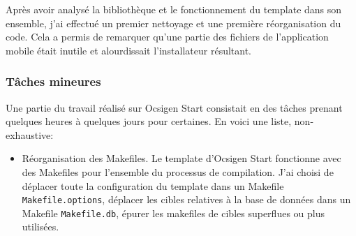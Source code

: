 Après avoir analysé la bibliothèque et le fonctionnement du template dans son
ensemble, j'ai effectué un premier nettoyage et une première réorganisation du
code. Cela a permis de remarquer qu'une partie des fichiers de l'application
mobile était inutile et alourdissait l'installateur résultant.

\subsubsection*{Tâches mineures}

Une partie du travail réalisé sur Ocsigen Start consistait en des tâches prenant
quelques heures à quelques jours pour certaines. En voici une liste,
non-exhaustive:

\begin{itemize}
\item Réorganisation des Makefiles. Le template d'Ocsigen Start fonctionne avec
  des Makefiles pour l'ensemble du processus de compilation. J'ai choisi de
  déplacer toute la configuration du template dans un Makefile
  \verb|Makefile.options|, déplacer les cibles relatives à la base de données
  dans un Makefile \verb|Makefile.db|, épurer les makefiles de cibles superflues
  ou plus utilisées.


\end{itemize}
